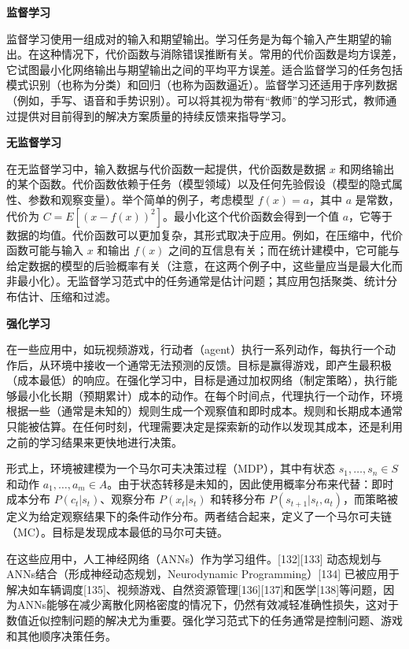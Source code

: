 \textbf{监督学习}  

监督学习使用一组成对的输入和期望输出。学习任务是为每个输入产生期望的输出。在这种情况下，代价函数与消除错误推断有关。常用的代价函数是均方误差，它试图最小化网络输出与期望输出之间的平均平方误差。适合监督学习的任务包括模式识别（也称为分类）和回归（也称为函数逼近）。监督学习还适用于序列数据（例如，手写、语音和手势识别）。可以将其视为带有“教师”的学习形式，教师通过提供对目前得到的解决方案质量的持续反馈来指导学习。

\textbf{无监督学习}  

在无监督学习中，输入数据与代价函数一起提供，代价函数是数据 \( x \) 和网络输出的某个函数。代价函数依赖于任务（模型领域）以及任何先验假设（模型的隐式属性、参数和观察变量）。举个简单的例子，考虑模型 \( f(x) = a \)，其中 \( a \) 是常数，代价为 \( C = E[(x - f(x))^2] \)。最小化这个代价函数会得到一个值 \( a \)，它等于数据的均值。代价函数可以更加复杂，其形式取决于应用。例如，在压缩中，代价函数可能与输入 \( x \) 和输出 \( f(x) \) 之间的互信息有关；而在统计建模中，它可能与给定数据的模型的后验概率有关（注意，在这两个例子中，这些量应当是最大化而非最小化）。无监督学习范式中的任务通常是估计问题；其应用包括聚类、统计分布估计、压缩和过滤。

\textbf{强化学习}  

在一些应用中，如玩视频游戏，行动者（agent）执行一系列动作，每执行一个动作后，从环境中接收一个通常无法预测的反馈。目标是赢得游戏，即产生最积极（成本最低）的响应。在强化学习中，目标是通过加权网络（制定策略），执行能够最小化长期（预期累计）成本的动作。在每个时间点，代理执行一个动作，环境根据一些（通常是未知的）规则生成一个观察值和即时成本。规则和长期成本通常只能被估算。在任何时刻，代理需要决定是探索新的动作以发现其成本，还是利用之前的学习结果来更快地进行决策。

形式上，环境被建模为一个马尔可夫决策过程（MDP），其中有状态 \( s_1, \dots, s_n \in S \) 和动作 \( a_1, \dots, a_m \in A \)。由于状态转移是未知的，因此使用概率分布来代替：即时成本分布 \( P(c_t | s_t) \)、观察分布 \( P(x_t | s_t) \) 和转移分布 \( P(s_{t+1} | s_t, a_t) \)，而策略被定义为给定观察结果下的条件动作分布。两者结合起来，定义了一个马尔可夫链（MC）。目标是发现成本最低的马尔可夫链。

在这些应用中，人工神经网络（ANNs）作为学习组件。[132][133] 动态规划与ANNs结合（形成神经动态规划，Neurodynamic Programming）[134] 已被应用于解决如车辆调度[135]、视频游戏、自然资源管理[136][137]和医学[138]等问题，因为ANNs能够在减少离散化网格密度的情况下，仍然有效减轻准确性损失，这对于数值近似控制问题的解决尤为重要。强化学习范式下的任务通常是控制问题、游戏和其他顺序决策任务。

